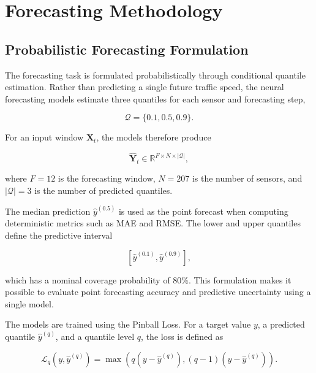 \section{Forecasting Methodology}
\label{sec:methodology}

\subsection{Probabilistic Forecasting Formulation}
\label{subsec:probabilistic}

The forecasting task is formulated probabilistically through conditional
quantile estimation. Rather than predicting a single future traffic speed,
the neural forecasting models estimate three quantiles for each sensor and
forecasting step,

\begin{equation}
    \mathcal{Q} = \{0.1, 0.5, 0.9\}.
    \label{eq:quantiles}
\end{equation}

For an input window $\mathbf{X}_t$, the models therefore produce

\begin{equation}
    \hat{\mathbf{Y}}_t
    \in
    \mathbb{R}^{F \times N \times |\mathcal{Q}|},
    \label{eq:probabilistic_output}
\end{equation}

where $F=12$ is the forecasting window, $N=207$ is the number of sensors,
and $|\mathcal{Q}|=3$ is the number of predicted quantiles.

The median prediction $\hat{y}^{(0.5)}$ is used as the point forecast when
computing deterministic metrics such as MAE and RMSE. The lower and upper
quantiles define the predictive interval

\begin{equation}
    \left[
        \hat{y}^{(0.1)},
        \hat{y}^{(0.9)}
    \right],
    \label{eq:prediction_interval}
\end{equation}

which has a nominal coverage probability of $80\%$. This formulation makes it
possible to evaluate point forecasting accuracy and predictive uncertainty
using a single model.


The models are trained using the Pinball Loss. For a target value $y$, a
predicted quantile $\hat{y}^{(q)}$, and a quantile level $q$, the loss is
defined as

\begin{equation}
    \mathcal{L}_{q}
    \left(y,\hat{y}^{(q)}\right)
    =
    \max
    \left(
        q\left(y-\hat{y}^{(q)}\right),
        (q-1)\left(y-\hat{y}^{(q)}\right)
    \right).
    \label{eq:pinball_loss}
\end{equation}

